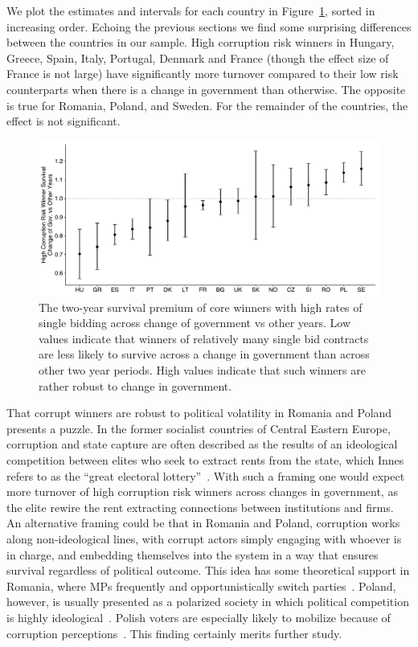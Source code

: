 We plot the estimates and intervals for each country in Figure~\ref{fig:core_sb_cog_surv}, sorted in increasing order. Echoing the previous sections we find some surprising differences between the countries in our sample. High corruption risk winners in Hungary, Greece, Spain, Italy, Portugal, Denmark and France (though the effect size of France is not large) have significantly more turnover compared to their low risk counterparts when there is a change in government than otherwise. The opposite is true for Romania, Poland, and Sweden. For the remainder of the countries, the effect is not significant.

\begin{figure}
\centering
  \includegraphics[width=\textwidth]{images/ted_networks/core_sb_cog_survival.pdf}
  \caption[Political turnover and corrupt winner turnover]{The two-year survival premium of core winners with high rates of single bidding across change of government vs other years. Low values indicate that winners of relatively many single bid contracts are less likely to survive across a change in government than across other two year periods. High values indicate that such winners are rather robust to change in government.}
  \label{fig:core_sb_cog_surv}
\end{figure}

That corrupt winners are robust to political volatility in Romania and Poland presents a puzzle. In the former socialist countries of Central Eastern Europe, corruption and state capture are often described as the results of an ideological competition between elites who seek to extract rents from the state, which Innes refers to as the ``great electoral lottery''~\cite{innes2002party}. With such a framing one would expect more turnover of high corruption risk winners across changes in government, as the elite rewire the rent extracting connections between institutions and firms. An alternative framing could be that in Romania and Poland, corruption works along non-ideological lines, with corrupt actors simply engaging with whoever is in charge, and embedding themselves into the system in a way that ensures survival regardless of political outcome. This idea has some theoretical support in Romania, where MPs frequently and opportunistically switch parties~\cite{fieruascu2018exploring}. Poland, however, is usually presented as a polarized society in which political competition is highly ideological~\cite{grzymalala2003great}. Polish voters are especially likely to mobilize because of corruption perceptions~\cite{slomczynski2012perceptions}. This finding certainly merits further study.

